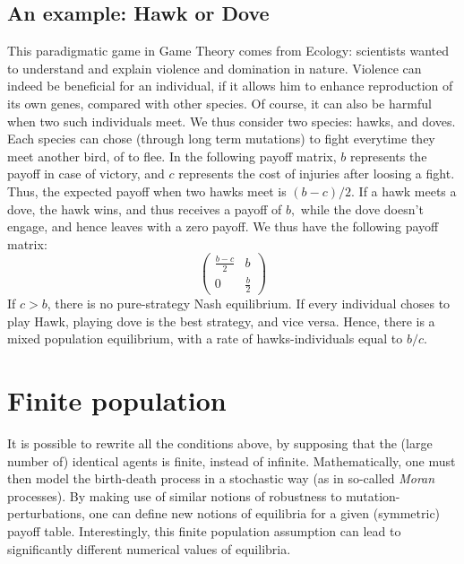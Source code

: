 \subsection{An example: Hawk or Dove}
This paradigmatic game in Game Theory comes from Ecology: scientists wanted to understand and explain violence and domination in nature.  Violence can indeed be beneficial for an individual, if it allows him to enhance reproduction of its own genes, compared with other species.  Of course, it can also be harmful when two such individuals meet. We thus consider two species: hawks, and doves.  Each species can chose (through long term mutations) to fight everytime they meet another bird, of to flee. In the following payoff matrix, $b$ represents the payoff in case of victory, and $c$ represents the cost of injuries after loosing a fight.  Thus, the expected payoff when two hawks meet is $(b-c)/2.$  If a hawk meets a dove, the hawk wins, and thus receives a payoff of $b,$ while the dove doesn't engage, and hence leaves with a zero payoff. We thus have the following payoff matrix:
\[
\begin{pmatrix}
	\frac{b-c}{2} & b \\
	0 & \frac{b}{2} 
\end{pmatrix}
\]
If $c>b$, there is no pure-strategy Nash equilibrium.  If every individual choses to play Hawk, playing dove is the best strategy, and vice versa.  Hence, there is a mixed population equilibrium, with a rate of hawks-individuals equal to $b/c.$
%


\section{Finite population}
It is possible to rewrite all the conditions above, by supposing that the (large number of) identical agents is finite, instead of infinite.  Mathematically, one must then model the birth-death process in a stochastic way (as in so-called \emph{Moran} processes). By making use of similar notions of robustness to mutation-perturbations, one can define new notions of equilibria for a given (symmetric) payoff table.  
Interestingly, this finite population assumption can lead to significantly different numerical values of equilibria.


\ifx \globalmark \undefined %



\else 
	
\fi
